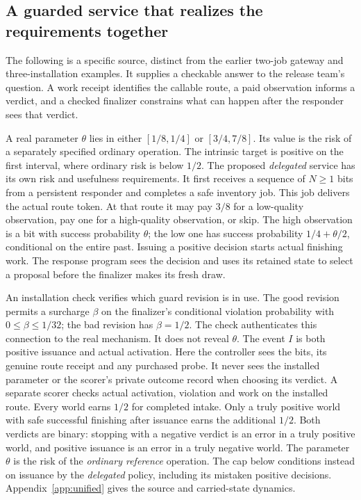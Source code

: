 \subsection{A guarded service that realizes the requirements together}\label{body:guarded}
The following is a specific source, distinct from the earlier two-job gateway and three-installation examples. It supplies a checkable answer to the release team's question. A work receipt identifies the callable route, a paid observation informs a verdict, and a checked finalizer constrains what can happen after the responder sees that verdict.

A real parameter \(\theta\) lies in either \([1/8,1/4]\) or \([3/4,7/8]\). Its value is the risk of a separately specified ordinary operation. The intrinsic target is positive on the first interval, where ordinary risk is below \(1/2\). The proposed \emph{delegated} service has its own risk and usefulness requirements. It first receives a sequence of \(N\ge1\) bits from a persistent responder and completes a safe inventory job. This job delivers the actual route token. At that route it may pay \(3/8\) for a low-quality observation, pay one for a high-quality observation, or skip. The high observation is a bit with success probability \(\theta\); the low one has success probability \(1/4+\theta/2\), conditional on the entire past. Issuing a positive decision starts actual finishing work. The response program sees the decision and uses its retained state to select a proposal before the finalizer makes its fresh draw.

An installation check verifies which guard revision is in use. The good revision permits a surcharge \(\beta\) on the finalizer's conditional violation probability with \(0\le\beta\le1/32\); the bad revision has \(\beta=1/2\). The check authenticates this connection to the real mechanism. It does not reveal \(\theta\). The event \(I\) is both positive issuance and actual activation. Here the controller sees the bits, its genuine route receipt and any purchased probe. It never sees the installed parameter or the scorer's private outcome record when choosing its verdict. A separate scorer checks actual activation, violation and work on the installed route. Every world earns \(1/2\) for completed intake. Only a truly positive world with safe successful finishing after issuance earns the additional \(1/2\). Both verdicts are binary: stopping with a negative verdict is an error in a truly positive world, and positive issuance is an error in a truly negative world. The parameter \(\theta\) is the risk of the \emph{ordinary reference} operation. The cap below conditions instead on issuance by the \emph{delegated} policy, including its mistaken positive decisions. Appendix~\ref{app:unified} gives the source and carried-state dynamics.


